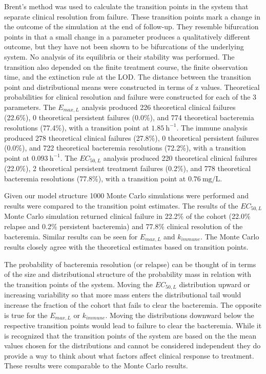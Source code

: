 \documentclass[12pt, draftcls, onecolumn]{IEEEtran}
\begin{document}
Brent's method was used to calculate the transition points in the system that separate clinical resolution from failure. These transition points mark a change in the outcome of the simulation at the end of follow-up. They resemble bifurcation points in that a small change in a parameter produces a qualitatively different outcome, but they have not been shown to be bifurcations of the underlying system.  No analysis of its equilibria or their stability was performed. The transition also depended on the finite treatment course, the finite observation time, and the extinction rule at the LOD. The distance between the transition point and distributional means were constructed in terms of z values.  Theoretical probabilities for clinical resolution and failure were constructed for each of the 3 parameters.  The $E_{max,L}$ analysis produced 226 theoretical clinical failures (22.6\%), 0 theoretical persistent failures (0.0\%), and 774 theoretical bacteremia resolutions (77.4\%), with a transition point at $1.85~\mathrm{h}^{-1}$. The immune analysis produced 278 theoretical clinical failures (27.8\%), 0 theoretical persistent failures (0.0\%), and 722 theoretical bacteremia resolutions (72.2\%), with a transition point at $0.093~\mathrm{h}^{-1}$.  The $EC_{50,L}$ analysis produced 220 theoretical clinical failures (22.0\%), 2 theoretical persistent treatment failures (0.2\%), and 778 theoretical bacteremia resolutions (77.8\%), with a transition point at $0.76~\mathrm{mg/L}$.


Given our model structure 1000 Monte Carlo simulations were performed and results were compared to the transition point estimates.  The results of the $EC_{50,L}$ Monte Carlo simulation returned clinical failure in 22.2\% of the cohort (22.0\% relapse and 0.2\% persistent bacteremia) and 77.8\% clinical resolution of the bacteremia.  Similar results can be seen for $E_{max,L}$ and $k_{immune}$.  The Monte Carlo results closely agree with the theoretical estimates based on transition points.

The probability of bacteremia resolution (or relapse) can be thought of in terms of the size and distributional structure of the probability mass in relation with the transition points of the system.  Moving the $EC_{50,L}$ distribution upward or increasing variability so that more mass enters the distributional tail would increase the fraction of the cohort that fails to clear the bacteremia.  The opposite is true for the $E_{max,L}$ or $k_{immune}$.  Moving the distributions downward below the respective transition points would lead to failure to clear the bacteremia.  While it is recognized that the transition points of the system are based on the the mean values chosen for the distributions and cannot be considered independent they do provide a way to think about what factors affect clinical response to treatment.  These results were comparable to the Monte Carlo results.
\end{document}
